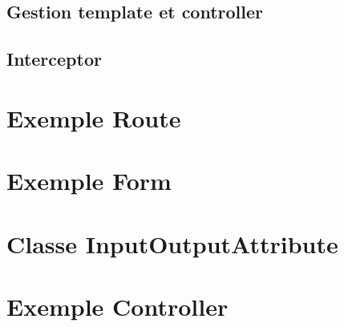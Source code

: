 		\subsection{Gestion template et controller}
		\subsection{Interceptor}
	\section{Exemple Route}
	\section{Exemple Form}
	\section{Classe InputOutputAttribute}
	\section{Exemple Controller}
